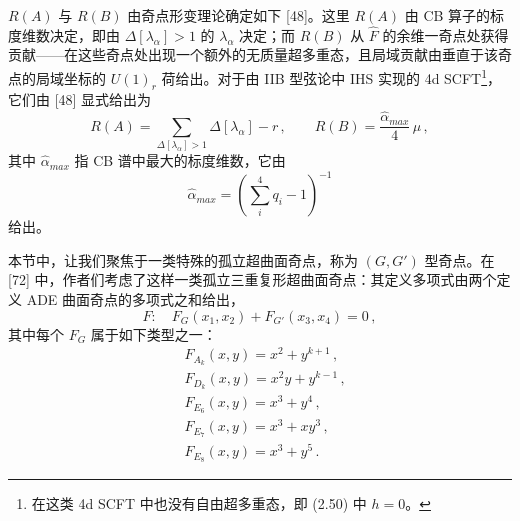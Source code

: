 $R(A)$ 与 $R(B)$ 由奇点形变理论确定如下 [48]。这里 $R(A)$ 由 CB 算子的标度维数决定，即由 $\Delta[\lambda_{\alpha}]>1$ 的 $\lambda_{\alpha}$ 决定；而 $R(B)$ 从 $\hat F$ 的余维一奇点处获得贡献——在这些奇点处出现一个额外的无质量超多重态，且局域贡献由垂直于该奇点的局域坐标的 $U(1)_r$ 荷给出。对于由 IIB 型弦论中 IHS 实现的 4d SCFT\footnote{在这类 4d SCFT 中也没有自由超多重态，即 (2.50) 中 $h=0$。}，它们由 [48] 显式给出为
\begin{equation}
  R(A) = \sum_{\Delta[\lambda_{\alpha}]>1}\Delta[\lambda_{\alpha}]-r\,,\qquad
  R(B) = \frac{\hat\alpha_{max}}{4}\,\mu\,,
  \tag{5.18}
\end{equation}
其中 $\hat\alpha_{max}$ 指 CB 谱中最大的标度维数，它由
\begin{equation}
  \hat\alpha_{max} = \left(\sum_{i}^{4}q_i-1\right)^{-1}
  \tag{5.19}\end{equation}
给出。



本节中，让我们聚焦于一类特殊的孤立超曲面奇点，称为 $(G,G')$ 型奇点。在 [72] 中，作者们考虑了这样一类孤立三重复形超曲面奇点：其定义多项式由两个定义 ADE 曲面奇点的多项式之和给出，
\begin{equation}
  F:\quad F_{G}(x_1,x_2)+F_{G'}(x_3,x_4) = 0\,,
  \tag{5.20}
\end{equation}
其中每个 $F_{G}$ 属于如下类型之一：
\begin{equation}
  \begin{aligned}
    &F_{A_k}(x,y) = x^2+y^{k+1}\,,\\
    &F_{D_k}(x,y) = x^2y+y^{k-1}\,,\\
    &F_{E_6}(x,y) = x^3+y^{4}\,,\\
    &F_{E_7}(x,y) = x^3+xy^{3}\,,\\
    &F_{E_8}(x,y) = x^3+y^{5}\,.
  \end{aligned}
  \tag{5.21}
\end{equation}


